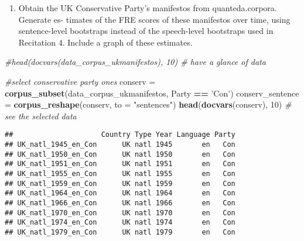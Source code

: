 \documentclass[]{article}
\newenvironment{Shaded}{\begin{snugshade}}{\end{snugshade}}
\newcommand{\KeywordTok}[1]{\textcolor[rgb]{0.13,0.29,0.53}{\textbf{#1}}}
\newcommand{\DataTypeTok}[1]{\textcolor[rgb]{0.13,0.29,0.53}{#1}}
\newcommand{\DecValTok}[1]{\textcolor[rgb]{0.00,0.00,0.81}{#1}}
\newcommand{\StringTok}[1]{\textcolor[rgb]{0.31,0.60,0.02}{#1}}
\newcommand{\CommentTok}[1]{\textcolor[rgb]{0.56,0.35,0.01}{\textit{#1}}}
\newcommand{\OperatorTok}[1]{\textcolor[rgb]{0.81,0.36,0.00}{\textbf{#1}}}
\newcommand{\NormalTok}[1]{#1}
\providecommand{\tightlist}{%
  \setlength{\itemsep}{0pt}\setlength{\parskip}{0pt}}
\begin{document}
\begin{enumerate}
\def\labelenumi{(\alph{enumi})}
\tightlist
\item
  Obtain the UK Conservative Party's manifestos from quanteda.corpora.
  Generate es- timates of the FRE scores of these manifestos over time,
  using sentence-level bootstraps instead of the speech-level bootstraps
  used in Recitation 4. Include a graph of these estimates.
\end{enumerate}

\begin{Shaded}
\begin{Highlighting}[]
\CommentTok{#head(docvars(data_corpus_ukmanifestos), 10) # have a glance of data}

\CommentTok{#select conservative party ones}
\NormalTok{conserv =}\StringTok{ }\KeywordTok{corpus_subset}\NormalTok{(data_corpus_ukmanifestos, Party }\OperatorTok{==}\StringTok{ 'Con'}\NormalTok{)}
\NormalTok{conserv_sentence =}\StringTok{ }\KeywordTok{corpus_reshape}\NormalTok{(conserv, }\DataTypeTok{to =} \StringTok{"sentences"}\NormalTok{)}
\KeywordTok{head}\NormalTok{(}\KeywordTok{docvars}\NormalTok{(conserv), }\DecValTok{10}\NormalTok{) }\CommentTok{# see the selected data}
\end{Highlighting}
\end{Shaded}

\begin{verbatim}
##                     Country Type Year Language Party
## UK_natl_1945_en_Con      UK natl 1945       en   Con
## UK_natl_1950_en_Con      UK natl 1950       en   Con
## UK_natl_1951_en_Con      UK natl 1951       en   Con
## UK_natl_1955_en_Con      UK natl 1955       en   Con
## UK_natl_1959_en_Con      UK natl 1959       en   Con
## UK_natl_1964_en_Con      UK natl 1964       en   Con
## UK_natl_1966_en_Con      UK natl 1966       en   Con
## UK_natl_1970_en_Con      UK natl 1970       en   Con
## UK_natl_1974_en_Con      UK natl 1974       en   Con
## UK_natl_1979_en_Con      UK natl 1979       en   Con
\end{verbatim}
\end{document}

